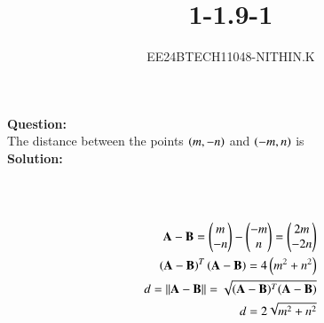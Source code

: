 \documentclass[journal]{IEEEtran}
\begin{document}


\title{1-1.9-1}
\author{EE24BTECH11048-NITHIN.K}
{\let\newpage\relax\maketitle}

\textbf{Question:} \\
The distance between the points $\left(m, -n\right)$ and $\left(-m, n\right)$ is \\
\textbf{Solution:} \\
\begin{table}[h!]
      \centering
      
      \caption{}
\end{table} \\
 \\
\begin{align}
	\mathbf{A} - \mathbf{B}=\begin{pmatrix}
		m \\
		-n\end{pmatrix} - \begin{pmatrix}
		-m \\
		n\end{pmatrix} = \begin{pmatrix}
		2m \\
		-2n\end{pmatrix} \\
	\left(\mathbf{A} - \mathbf{B}\right)^T\left(\mathbf{A} - \mathbf{B}\right) = 4\left(m^2+n^2\right) \\
	d=||\mathbf{A} - \mathbf{B}||=\sqrt{(\mathbf{A} - \mathbf{B})^T(\mathbf{A} - \mathbf{B})} \\
	d=2\sqrt{m^2+n^2}
\end{align}
\end{document}
